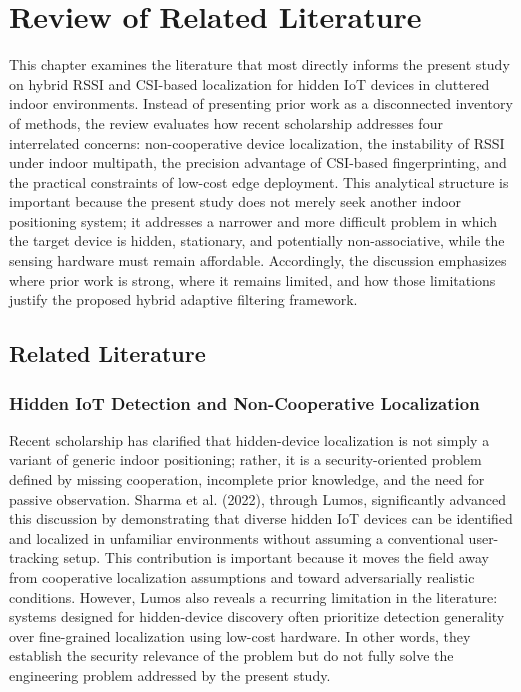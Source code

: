 \section{Review of Related Literature}

This chapter examines the literature that most directly informs the present study on hybrid RSSI and CSI-based localization for hidden IoT devices in cluttered indoor environments. Instead of presenting prior work as a disconnected inventory of methods, the review evaluates how recent scholarship addresses four interrelated concerns: non-cooperative device localization, the instability of RSSI under indoor multipath, the precision advantage of CSI-based fingerprinting, and the practical constraints of low-cost edge deployment. This analytical structure is important because the present study does not merely seek another indoor positioning system; it addresses a narrower and more difficult problem in which the target device is hidden, stationary, and potentially non-associative, while the sensing hardware must remain affordable. Accordingly, the discussion emphasizes where prior work is strong, where it remains limited, and how those limitations justify the proposed hybrid adaptive filtering framework.

\subsection{Related Literature}

\subsubsection{Hidden IoT Detection and Non-Cooperative Localization}
Recent scholarship has clarified that hidden-device localization is not simply a variant of generic indoor positioning; rather, it is a security-oriented problem defined by missing cooperation, incomplete prior knowledge, and the need for passive observation. Sharma et al. (2022), through Lumos, significantly advanced this discussion by demonstrating that diverse hidden IoT devices can be identified and localized in unfamiliar environments without assuming a conventional user-tracking setup. This contribution is important because it moves the field away from cooperative localization assumptions and toward adversarially realistic conditions. However, Lumos also reveals a recurring limitation in the literature: systems designed for hidden-device discovery often prioritize detection generality over fine-grained localization using low-cost hardware. In other words, they establish the security relevance of the problem but do not fully solve the engineering problem addressed by the present study.

